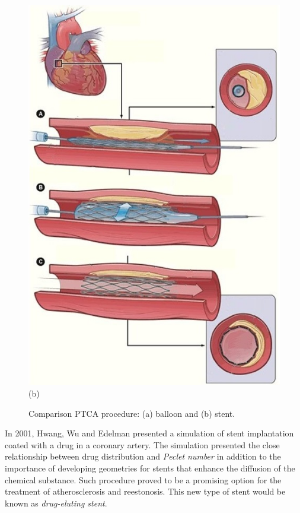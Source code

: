 \begin{figure}[H]
\begin{minipage}{.50\linewidth}
      \includegraphics[scale=0.5]{./02_chaps/cap_review/figure/stent_bare.jpg}\\
      (b)
     \end{minipage}
     \medskip
     \caption{Comparison PTCA procedure:
              (a) balloon and
              (b) stent.}
     \label{procedimentos PTCA}
\end{figure}

\medskip
In 2001, Hwang, Wu and Edelman \cite{hwang2001} presented a simulation of stent implantation
coated with a drug in a coronary artery. 
The simulation presented the
close relationship between drug distribution and \textit{Peclet number}
in addition to the importance of developing geometries for stents that enhance
the diffusion of the chemical substance. 
Such procedure proved to be a promising option
for the treatment of atherosclerosis and reestonosis. 
This new type of stent
would be known as \textit{drug-eluting stent}.


